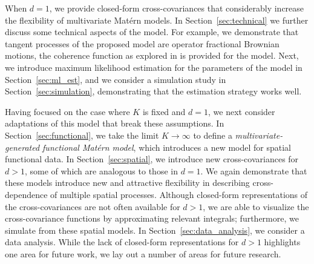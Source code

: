 \documentclass[11pt]{article}
\begin{document}
When $d=1$, we provide closed-form cross-covariances that considerably increase the flexibility of multivariate Mat\'ern models. 
In Section~\ref{sec:technical} we further discuss some technical aspects of the model. 
For example, we demonstrate that tangent processes of the proposed model are operator fractional Brownian motions, the coherence function as explored in \cite{kleiber_coherence_2018} is provided for the model. 
Next, we introduce maximum likelihood estimation for the parameters of the model in Section~\ref{sec:ml_est}, and we consider a simulation study in Section~\ref{sec:simulation}, demonstrating that the estimation strategy works well.

Having focused on the case where $K$ is fixed and $d=1$, we next consider adaptations of this model that break these assumptions. 
In Section~\ref{sec:functional}, we take the limit $K \to \infty$ to define a \textit{multivariate-generated functional Mat\'ern model}, which introduces a new model for spatial functional data. 
In Section~\ref{sec:spatial}, we introduce new cross-covariances for $d > 1$, some of which are analogous to those in $d=1$. 
We again demonstrate that these models introduce new and attractive flexibility in describing cross-dependence of multiple spatial processes. 
Although closed-form representations of the cross-covariances are not often available for $d > 1$, we are able to visualize the cross-covariance functions by approximating relevant integrals; furthermore, we simulate from these spatial models.
In Section~\ref{sec:data_analysis}, we consider a data analysis.
While the lack of closed-form representations for $d >1$ highlights one area for future work, we lay out a number of areas for future research.
\end{document}
